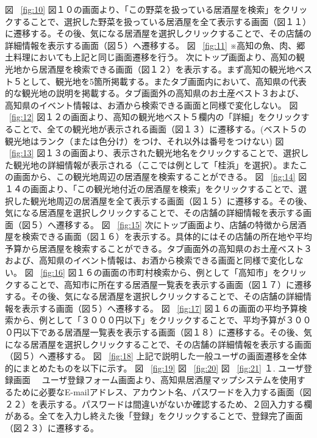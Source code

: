 図 ~\ref{fig:10}
図１０の画面より、「この野菜を扱っている居酒屋を検索」をクリックすることで、選択した野菜を扱っている居酒屋を全て表示する画面（図１１）に遷移する。その後、気になる居酒屋を選択しクリックすることで、その店舗の詳細情報を表示する画面（図５）へ遷移する。
図 ~\ref{fig:11}
※高知の魚、肉、郷土料理においても上記と同じ画面遷移を行う。
次にトップ画面より、高知の観光地から居酒屋を検索できる画面（図１２）を表示する。まず高知の観光地ベスト５として、観光地を5箇所掲載する。またタブ画面内において、高知県の代表的な観光地の説明を掲載する。タブ画面外の高知県のお土産ベスト３および、高知県のイベント情報は、お酒から検索できる画面と同様で変化しない。
図 ~\ref{fig:12}
図１２の画面より、高知の観光地ベスト５欄内の「詳細」をクリックすることで、全ての観光地が表示される画面（図１３）に遷移する。(ベスト５の観光地はランク（または色分け）をつけ、それ以外は番号をつけない)
図 ~\ref{fig:13}
図１３の画面より、表示された観光地名をクリックすることで、選択した観光地の詳細情報が表示される（ここでは例として「桂浜」を選択）。またこの画面から、この観光地周辺の居酒屋を検索することができる。
図 ~\ref{fig:14}
図１４の画面より、「この観光地付近の居酒屋を検索」をクリックすることで、選択した観光地周辺の居酒屋を全て表示する画面（図１５）に遷移する。その後、気になる居酒屋を選択しクリックすることで、その店舗の詳細情報を表示する画面（図５）へ遷移する。
図 ~\ref{fig:15}
次にトップ画面より、店舗の特徴から居酒屋を検索できる画面（図１６）を表示する。具体的にはその店舗の所在地や平均予算から居酒屋を検索することができる。タブ画面外の高知県のお土産ベスト３および、高知県のイベント情報は、お酒から検索できる画面と同様で変化しない。
図 ~\ref{fig:16}
図１６の画面の市町村検索から、例として「高知市」をクリックすることで、高知市に所在する居酒屋一覧表を表示する画面（図１７）に遷移する。その後、気になる居酒屋を選択しクリックすることで、その店舗の詳細情報を表示する画面（図５）へ遷移する。
図 ~\ref{fig:17}
図１６の画面の平均予算検索から、例として「３０００円以下」をクリックすることで、平均予算が３０００円以下である居酒屋一覧表を表示する画面（図１８）に遷移する。その後、気になる居酒屋を選択しクリックすることで、その店舗の詳細情報を表示する画面（図５）へ遷移する。
図 ~\ref{fig:18}
上記で説明した一般ユーザの画面遷移を全体的にまとめたものを以下に示す。
図 ~\ref{fig:19}
図 ~\ref{fig:20}
図 ~\ref{fig:21}
１. ユーザ登録画面
　ユーザ登録フォーム画面より、高知県居酒屋マップシステムを使用するために必要なE-mailアドレス、アカウント名、パスワードを入力する画面（図２２）を表示する。パスワードは間違いがないか確認するため、２回入力する欄がある。全てを入力し終えた後「登録」をクリックすることで、登録完了画面（図２３）に遷移する。
